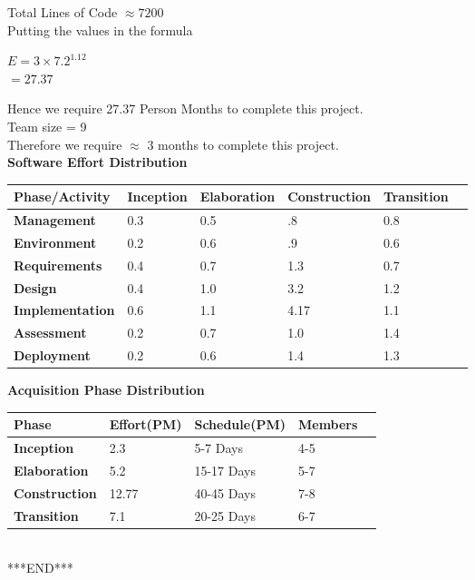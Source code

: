 \documentclass[12pt]{article}
\begin{document}
	\large{Total Lines of Code $\approx 7200$}\\
	
	Putting the values in the formula 
	\begin{center}
		$E = 3 \times 7.2^{1.12}$\\
		$ = 27.37$
	\end{center}
	
	Hence we require 27.37 Person Months to complete this project.\\
	
	\large{Team size = 9}\\
	
	Therefore we require $\approx$ 3 months to complete this project.\\
	
	\large{\textbf{Software Effort Distribution}}
	
	\begin{center}
		\begin{tabular}{ | l | l | l | l | l | p{1cm} |}
			\hline
			\textbf{Phase/Activity} & \textbf{Inception} & \textbf{Elaboration} & \textbf{Construction} & \textbf{Transition}  \\ \hline
			\textbf{Management} & 0.3 & 0.5 & .8 & 0.8 \\ \hline
			\textbf{Environment} & 0.2 & 0.6 & .9 & 0.6\\ \hline
			\textbf{Requirements} & 0.4 & 0.7 & 1.3 & 0.7\\\hline
			\textbf{Design} & 0.4 & 1.0 & 3.2  &1.2 \\ \hline
			\textbf{Implementation} & 0.6 & 1.1 & 4.17 & 1.1\\ \hline
			\textbf{Assessment} & 0.2 & 0.7 & 1.0 & 1.4\\ \hline
			\textbf{Deployment} & 0.2 & 0.6 & 1.4 & 1.3\\ \hline
		\end{tabular}
	\end{center}
	\newpage
	\large{\textbf{Acquisition Phase Distribution}}
	
	\begin{center}
		\begin{tabular}{ | l | l | l | l | p{1cm} |}
			\hline
			\textbf{Phase} & \textbf{Effort(PM)} & \textbf{Schedule(PM)} & \textbf{Members}  \\ \hline
			\textbf{Inception} & 2.3 & 5-7 Days & 4-5  \\ \hline
			\textbf{Elaboration} & 5.2 & 15-17 Days & 5-7 \\ \hline
			\textbf{Construction} & 12.77 & 40-45 Days & 7-8 \\\hline
			\textbf{Transition} & 7.1 & 20-25 Days & 6-7 \\ \hline
			
		\end{tabular}
		\\[2\baselineskip]
		
		***END***
	\end{center}
	
\end{document}
